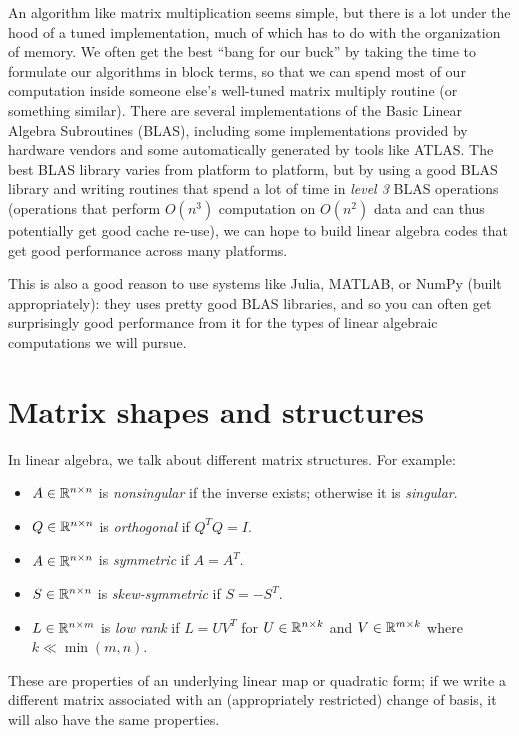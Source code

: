 \documentclass[12pt, leqno]{article} %
\begin{document}
An algorithm like matrix multiplication seems simple, but there is a
lot under the hood of a tuned implementation, much of which has to do
with the organization of memory.  We often get the best ``bang for our
buck'' by taking the time to formulate our algorithms in block terms,
so that we can spend most of our computation inside someone else's
well-tuned matrix multiply routine (or something similar).  There are
several implementations of the Basic Linear Algebra Subroutines
(BLAS), including some implementations provided by hardware vendors
and some automatically generated by tools like ATLAS.  The best BLAS
library varies from platform to platform, but by using a good BLAS
library and writing routines that spend a lot of time in {\em level 3}
BLAS operations (operations that perform $O(n^3)$ computation on
$O(n^2)$ data and can thus potentially get good cache re-use), we can
hope to build linear algebra codes that get good performance across
many platforms.

This is also a good reason to use systems like Julia, MATLAB, or NumPy
(built appropriately): they uses pretty good BLAS libraries, and so
you can often get surprisingly good performance from it for the types
of linear algebraic computations we will pursue.

\section{Matrix shapes and structures}

In linear algebra, we talk about different matrix structures.
For example:
\begin{itemize}
\item $A \in \mathbb{R}^{n \times n}$ is {\em nonsingular} if the inverse
  exists; otherwise it is {\em singular}.
\item $Q \in \mathbb{R}^{n \times n}$ is {\em orthogonal} if $Q^T Q = I$.
\item $A \in \mathbb{R}^{n \times n}$ is {\em symmetric} if $A = A^T$.
\item $S \in \mathbb{R}^{n \times n}$ is {\em skew-symmetric} if $S = -S^T$.
\item $L \in \mathbb{R}^{n \times m}$ is {\em low rank} if $L = UV^T$
  for $U \in \mathbb{R}^{n \times k}$ and $V \in \mathbb{R}^{m \times k}$ where
  $k \ll \min(m,n)$.
\end{itemize}
These are properties of an underlying linear map or quadratic form; if
we write a different matrix associated with an (appropriately
restricted) change of basis, it will also have the same properties.
\end{document}

